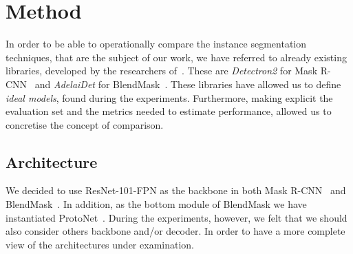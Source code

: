 \documentclass[10pt,twocolumn,letterpaper]{article}
\begin{document}
\section{Method}
In order to be able to operationally compare the instance segmentation techniques, that are the subject of our work, we have referred to already existing libraries, developed by the researchers of~\cite{Authors1_maskrcnn, Authors2_BlendMask}.  These are \textit{Detectron2} for Mask R-CNN~\cite{Authors1_maskrcnn} and \textit{AdelaiDet} for BlendMask~\cite{Authors2_BlendMask}.
These libraries have allowed us to define \textit{ideal models}, found during the experiments. Furthermore, making explicit the evaluation set and the metrics needed to estimate performance, allowed us to concretise the concept of comparison.

\subsection{Architecture}
We decided to use ResNet-101-FPN as the backbone in both Mask R-CNN~\cite{Authors1_maskrcnn} and BlendMask~\cite{Authors2_BlendMask}. In addition, as the bottom module of BlendMask we have instantiated ProtoNet~\cite{protonet}. During the experiments, however, we felt that we should also consider others backbone and/or decoder. In order to have a more complete view of the architectures under examination.
\end{document}
